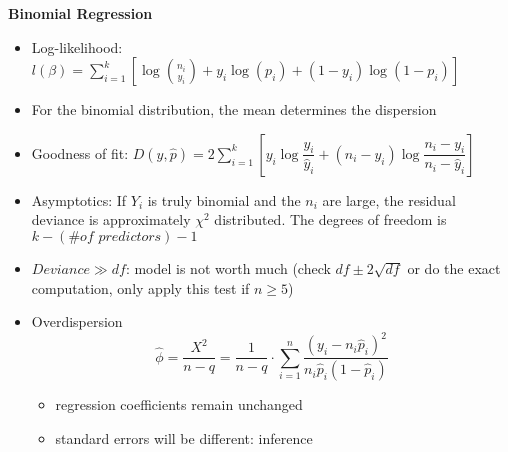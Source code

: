 \documentclass[a4paper]{article}
\begin{document}
\textbf{Binomial Regression}
\begin{itemize}
    \item Log-likelihood: $l(\beta)=\sum_{i=1}^{k}\left[\log \binom{n_i}{y_i}+y_i\log(p_i)+(1-y_i)\log(1-p_i) \right]$
    \item For the binomial distribution, the mean determines the dispersion
    \item Goodness of fit: $D(y,\hat{p})=2\sum\limits_{i=1}^k\left[y_i\log\dfrac{y_i}{\hat{y}_i}+(n_i-y_i)\log\dfrac{n_i-y_i}{n_i-\hat{y}_i} \right] $
    \item Asymptotics: If $Y_i$ is truly binomial and the $n_i$ are large, the residual deviance is approximately $\chi^2$ distributed. The degrees of freedom is $k-(\textit{\# of predictors})-1$
    \item $Deviance\gg df$: model is not worth much (check $df\pm2\sqrt{df}$ or do the exact computation, only apply this test if $n\geq 5$)
    \item Overdispersion
    \[\hat{\phi}=\frac{X^2}{n-q}=\frac{1}{n-q}\cdot\sum_{i=1}^n\frac{(y_i-n_i\hat{p}_i)^2}{n_i\hat{p}_i(1-\hat{p}_i)} \]
    \begin{itemize}
        \item regression coefficients remain unchanged
        \item standard errors will be different: inference
    \end{itemize}
\end{itemize}
\end{document}
